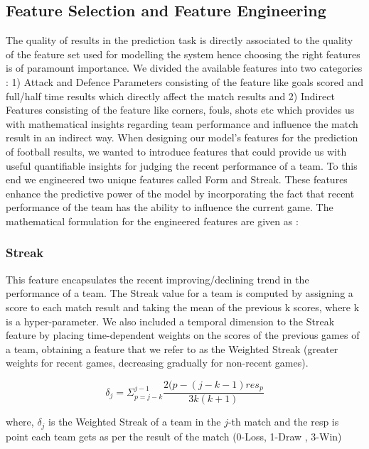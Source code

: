 \documentclass{article}
\begin{document}
\subsection{Feature Selection and Feature Engineering}
The quality of results in the prediction task is directly associated to the quality of the feature set used for modelling the system hence choosing the right features is of paramount importance. We divided the available features into two categories : 1) Attack and Defence Parameters consisting of the feature like goals scored and full/half time results which directly affect the match results and 2) Indirect Features consisting of the feature like corners, fouls, shots etc which provides us with mathematical insights regarding team performance and influence the match result in an indirect way. 
    When designing our model’s features for the prediction of football results, we wanted to introduce features that could provide us with useful quantifiable insights for judging the recent performance of a team. To this end we engineered two unique features called Form and Streak. These features enhance the predictive power of the model by incorporating the fact that recent performance of the team has the ability to influence the current game. The mathematical formulation for the engineered features are given as :

\subsubsection{Streak}
This feature encapsulates the recent improving/declining trend in the performance of a team. The Streak value for a team is computed by assigning a score to each match result and taking the mean of the previous k scores, where k is a hyper-parameter. We also included a temporal dimension to the Streak feature by placing time-dependent weights on the scores of the previous games of a team, obtaining a feature that we refer to as the Weighted Streak (greater weights for recent games, decreasing gradually for non-recent games).

\begin{equation}
\delta_j = \Sigma_{p=j-k}^{j-1} \frac{2(p-(j-k-1) res_{p}}{3k(k+1)}
\label{eq:streak}
\end{equation}

where, $\delta_j$ is the Weighted Streak of a team in the $j$-th match and the resp is point each team gets as per the result of the match (0-Loss, 1-Draw , 3-Win)
\end{document}
